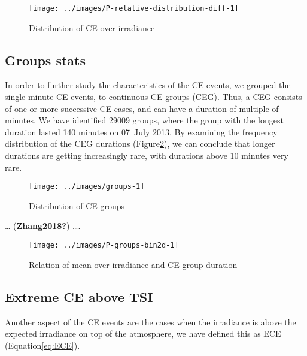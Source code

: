 \documentclass[
  preprint, 3p, authoryear]{article}
\begin{document}
\begin{figure}

{\centering \texttt{[image: ../images/P-relative-distribution-diff-1]} 

}

\caption{Distribution of CE over irradiance}\label{fig:ovir-distribution}
\end{figure}

\hypertarget{groups-stats}{%
\subsection{Groups stats}\label{groups-stats}}

In order to further study the characteristics of the CE events, we grouped the single
minute CE events, to continuous CE groups (CEG). Thus, a CEG consists of one or more
successive CE cases, and can have a duration of multiple of minutes. We have
identified 29009 groups, where the group with the longest duration lasted
140 minutes on
07~July 2013.
By examining the frequency distribution of the CEG durations
(Figure\nobreakspace{}\ref{fig:ceg-duration-distribution}), we can conclude that
longer durations are getting increasingly rare, with durations above 10 minutes very
rare.

\begin{figure}

{\centering \texttt{[image: ../images/groups-1]} 

}

\caption{Distribution of CE groups}\label{fig:ceg-duration-distribution}
\end{figure}

\ldots{} (\textbf{Zhang2018?}) \ldots.

\begin{figure}

{\centering \texttt{[image: ../images/P-groups-bin2d-1]} 

}

\caption{Relation of mean over irradiance and CE group duration}\label{fig:unnamed-chunk-3}
\end{figure}

\hypertarget{extreme-ce-above-tsi}{%
\subsection{Extreme CE above TSI}\label{extreme-ce-above-tsi}}

Another aspect of the CE events are the cases when the irradiance is above the
expected irradiance on top of the atmosphere, we have defined this as ECE
(Equation\nobreakspace{}\ref{eq:ECE}).
\end{document}
